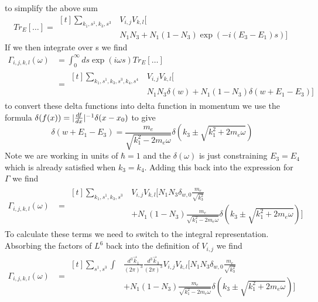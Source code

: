 to simplify the above sum
\begin{equation}
    Tr_E[\dots] = \begin{aligned}[t]
        \sum_{k_1,s^1,k_3,s^3 }
         & V_{i,j} V_{k,l} [ \\
         & N_1 N_3
                + N_1 (1 - N_3) \exp{(-i(E_3 - E_1)s)}]
    \end{aligned}
\end{equation}
If we then integrate over s we find
\begin{align}
    \Gamma_{i,j, k,l}(\omega) & =
    \int_0^\infty{}{
        ds \exp{(i\omega{}s)} Tr_{E}[\dots]
    }                                                      \\
    {}                        & =\begin{aligned}[t]
        \sum_{k_1,s^1,k_3,s^3,k_4,s^4 }
         & V_{i,j} V_{k,l} [ \\
         & N_1 N_3 \delta(w)
                + N_1 (1 - N_3)  \delta(w + E_1 -E_3) ]
    \end{aligned}
\end{align}
to convert these delta functions
into delta function in momentum we
use the formula
\(\delta(f(x)) =
\lvert\frac{df}{dx}\rvert^{-1}\delta(x - x_0)\)
to give
\begin{equation}
    \delta(w + E_1 -E_3) =
    \frac{m_e}{\sqrt{k_1^2 - 2m_e\omega}}
    \delta({k_3 \pm \sqrt{k_1^2 + 2m_e\omega}})
\end{equation}
Note we are working in units of \(\hbar = 1\)
and the \(\delta(\omega)\) is just
constraining \(E_3 = E_4\) which is
already satisfied when \(k_3 = k_4\).
Adding this back into the expression
for \(\Gamma \) we find
\begin{align}
    \Gamma_{i,j, k,l}(\omega) & =\begin{aligned}[t]
        \sum_{k_1,s^1,k_3,s^3 }
         & V_{i,j} V_{k,l} [
        N_1 N_3 \delta_{w, 0} \frac{m_e}{\sqrt{k_3^2}} \\
         & + N_1 (1 - N_3)
                \frac{m_e}{\sqrt{k_1^2 - 2m_e\omega}}
                \delta({k_3 \pm \sqrt{k_1^2 + 2m_e\omega}}) ]
    \end{aligned}
\end{align}
To calculate these terms we
need to switch to the integral
representation. Absorbing the factors
of \(L^6\) back into the definition
of \(V_{i,j}\) we find
\begin{align}
    \Gamma_{i,j, k,l}(\omega) & =\begin{aligned}[t]
        \sum_{s^1,s^3} \int &
        \frac{d^3\vec{k}_1}{{(2\pi)}^3}
        \frac{d^3\vec{k}_3}{{(2\pi)}^3}
        V_{i,j} V_{k,l} [
        N_1 N_3 \delta_{w, 0} \frac{m_e}{\sqrt{k_3^2}} \\
                            & + N_1 (1 - N_3)
                \frac{m_e}{\sqrt{k_1^2 - 2m_e\omega}}
                \delta({k_3 \pm \sqrt{k_1^2 + 2m_e\omega}}) ]
    \end{aligned}
\end{align}
